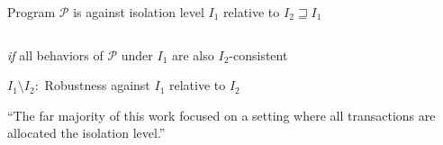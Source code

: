 
\begin{frame}{}
	\begin{center}
	\end{center}
\end{frame}

\begin{frame}{}
	\begin{center}
		Program $\mathcal{P}$ is 
		against isolation level $I_{1}$ relative to $I_{2} \sqsupseteq I_{1}$

		\begin{columns}
		\end{columns}

		\vspace{0.60cm}
		{\it if} all behaviors of $\mathcal{P}$ under $I_{1}$
		are also $I_{2}$-consistent
	\end{center}
\end{frame}



\begin{frame}{}
	\begin{center}
    $I_{1} \setminus I_{2}:$ Robustness against $I_{1}$ relative to $I_{2}$
		

		\pause
		\vspace{0.10cm}
		``The far majority of this work focused on
			a  setting
			where all transactions are allocated
			the  isolation level.''
	\end{center}
\end{frame}



